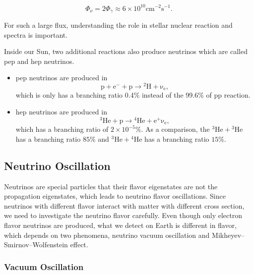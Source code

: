 \begin{equation}
\Phi_\nu = 2 \Phi_\gamma \approx 6\times 10^{10} \mathrm{cm^{-2}s^{-1}}.
\end{equation}


For such a large flux, understanding the role in stellar nuclear reaction and spectra is important.

Inside our Sun, two additional reactions also produce neutrinos which are called pep and hep neutrinos.

\begin{itemize}
\item pep neutrinos are produced in 
\begin{equation}
\mathrm{p + e^- + p \to {}^2H +\nu_e},
\end{equation}
which is only has a branching ratio 0.4\% instead of the 99.6\% of pp reaction.
\item hep neutrinos are produced in
\begin{equation}
\mathrm{ {}^3He + p \to {}^4He + e^+ \nu_e },
\end{equation}
which has a branching ratio of $2\times 10^{-5}\%$. As a comparison, the $\mathrm{{}^3He + {}^3He}$ has a branching ratio $85\%$ and $\mathrm{{}^3He + {}^4He}$ has a branching ratio $15\%$.

\end{itemize}













\subsection{Neutrino Oscillation}


Neutrinos are special particles that their flavor eigenstates are not the propagation eigenstates, which leads to neutrino flavor oscillations. Since neutrinos with different flavor interact with matter with different cross section, we need to investigate the neutrino flavor carefully. Even though only electron flavor neutrinos are produced, what we detect on Earth is different in flavor, which depends on two phenomena, neutrino vacuum oscillation and Mikheyev–Smirnov–Wolfenstein effect.

\subsubsection{Vacuum Oscillation}

